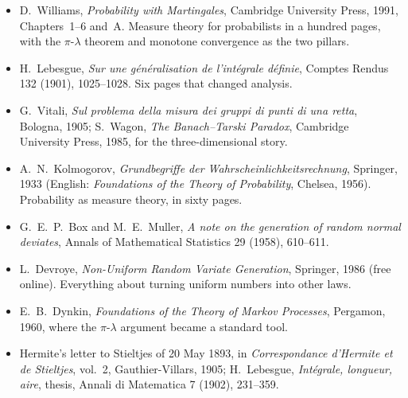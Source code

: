 \begin{itemize}
\item D.~Williams, \emph{Probability with Martingales}, Cambridge University Press, 1991, Chapters~1--6 and~A. Measure
theory for probabilists in a hundred pages, with the $\pi$-$\lambda$ theorem and monotone convergence as the two pillars.
\item H.~Lebesgue, \emph{Sur une g\'en\'eralisation de l'int\'egrale d\'efinie}, Comptes Rendus 132 (1901), 1025--1028. Six pages
that changed analysis.
\item G.~Vitali, \emph{Sul problema della misura dei gruppi di punti di una retta}, Bologna, 1905; S.~Wagon, \emph{The
Banach--Tarski Paradox}, Cambridge University Press, 1985, for the three-dimensional story.
\item A.~N.~Kolmogorov, \emph{Grundbegriffe der Wahrscheinlichkeitsrechnung}, Springer, 1933 (English: \emph{Foundations of
the Theory of Probability}, Chelsea, 1956). Probability as measure theory, in sixty pages.
\item G.~E.~P.~Box and M.~E.~Muller, \emph{A note on the generation of random normal deviates}, Annals of
Mathematical Statistics 29 (1958), 610--611.
\item L.~Devroye, \emph{Non-Uniform Random Variate Generation}, Springer, 1986 (free online). Everything about turning
uniform numbers into other laws.
\item E.~B.~Dynkin, \emph{Foundations of the Theory of Markov Processes}, Pergamon, 1960, where the $\pi$-$\lambda$ argument
became a standard tool.
\item Hermite's letter to Stieltjes of 20 May 1893, in \emph{Correspondance d'Hermite et de Stieltjes}, vol.~2, Gauthier-Villars, 1905; H.~Lebesgue, \emph{Int\'egrale, longueur, aire}, thesis, Annali di Matematica 7 (1902), 231--359.
\end{itemize}
